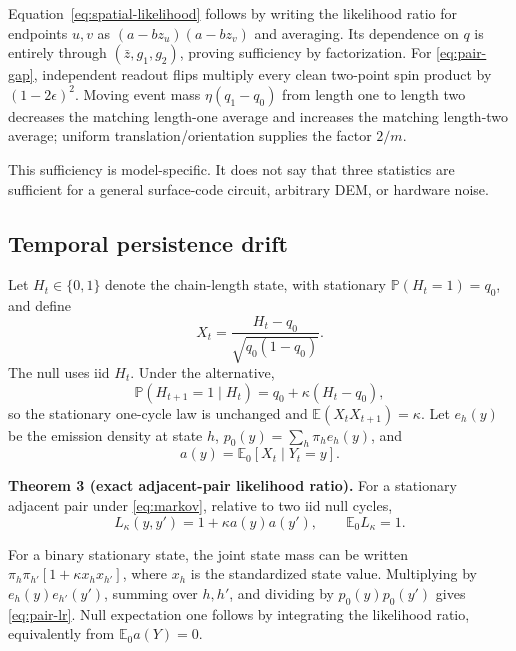 \documentclass[letterpaper,journal]{IEEEtran}
\newcommand{\E}{\mathbb E}
\newcommand{\Prb}{\mathbb P}
\begin{document}
\begin{IEEEproof}
Equation~\eqref{eq:spatial-likelihood} follows by writing the likelihood ratio
for endpoints $u,v$ as
$(a-bz_u)(a-bz_v)$ and averaging. Its dependence on $q$ is entirely through
$(\bar z,g_1,g_2)$, proving sufficiency by factorization. For
\eqref{eq:pair-gap}, independent readout flips multiply every clean
two-point spin product by $(1-2\epsilon)^2$. Moving event mass
$\eta(q_1-q_0)$ from length one to length two decreases the matching
length-one average and increases the matching length-two average; uniform
translation/orientation supplies the factor $2/m$.
\end{IEEEproof}

This sufficiency is model-specific. It does not say that three statistics are
sufficient for a general surface-code circuit, arbitrary DEM, or hardware
noise.

\subsection{Temporal persistence drift}

Let $H_t\in\{0,1\}$ denote the chain-length state, with stationary
$\Prb(H_t=1)=q_0$, and define
\begin{equation}
X_t=\frac{H_t-q_0}{\sqrt{q_0(1-q_0)}}.
\end{equation}
The null uses iid $H_t$. Under the alternative,
\begin{equation}
\Prb(H_{t+1}=1\mid H_t)=q_0+\kappa(H_t-q_0),
\label{eq:markov}
\end{equation}
so the stationary one-cycle law is unchanged and
$\E(X_tX_{t+1})=\kappa$. Let $e_h(y)$ be the emission density at state $h$,
$p_0(y)=\sum_h\pi_he_h(y)$, and
\begin{equation}
a(y)=\E_0[X_t\mid Y_t=y].
\end{equation}

\textbf{Theorem 3 (exact adjacent-pair likelihood ratio).}
For a stationary adjacent pair under \eqref{eq:markov}, relative to two iid
null cycles,
\begin{equation}
L_\kappa(y,y')=1+\kappa a(y)a(y'),\qquad
\E_0 L_\kappa=1.
\label{eq:pair-lr}
\end{equation}

\begin{IEEEproof}
For a binary stationary state, the joint state mass can be written
$\pi_h\pi_{h'}[1+\kappa x_hx_{h'}]$, where $x_h$ is the standardized state
value. Multiplying by $e_h(y)e_{h'}(y')$, summing over $h,h'$, and dividing by
$p_0(y)p_0(y')$ gives \eqref{eq:pair-lr}. Null expectation one follows by
integrating the likelihood ratio, equivalently from $\E_0a(Y)=0$.
\end{IEEEproof}
\end{document}
